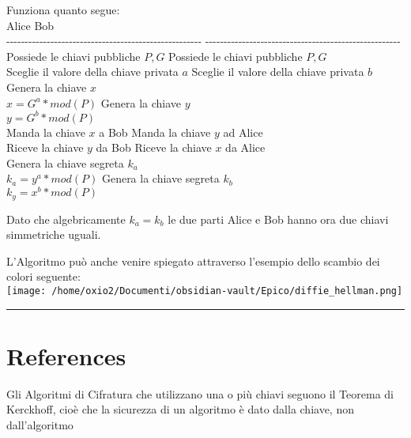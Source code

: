 \documentclass[
]{article}
\begin{document}
Funziona quanto segue:\\
\textbar{} Alice \textbar{} Bob \textbar{}\\
\textbar{}
-\/-\/-\/-\/-\/-\/-\/-\/-\/-\/-\/-\/-\/-\/-\/-\/-\/-\/-\/-\/-\/-\/-\/-\/-\/-\/-\/-\/-\/-\/-\/-\/-\/-\/-\/-\/-\/-\/-\/-\/-\/-\/-\/-\/-\/-\/-\/-\/-\/-\/-\/-\/-
\textbar{}
-\/-\/-\/-\/-\/-\/-\/-\/-\/-\/-\/-\/-\/-\/-\/-\/-\/-\/-\/-\/-\/-\/-\/-\/-\/-\/-\/-\/-\/-\/-\/-\/-\/-\/-\/-\/-\/-\/-\/-\/-\/-\/-\/-\/-\/-\/-\/-\/-\/-\/-\/-\/-
\textbar{}\\
\textbar{} Possiede le chiavi pubbliche {\(P,G\)} \textbar{} Possiede le
chiavi pubbliche {\(P,G\)} \textbar{}\\
\textbar{} Sceglie il valore della chiave privata {\(a\)} \textbar{}
Sceglie il valore della chiave privata {\(b\)} \textbar{}\\
\textbar{} Genera la chiave {\(x\)}\\
{\(x = G^{a} \ast mod(P)\)} \textbar{} Genera la chiave {\(y\)}\\
{\(y = G^{b} \ast mod(P)\)} \textbar{}\\
\textbar{} Manda la chiave {\(x\)} a Bob \textbar{} Manda la chiave
{\(y\)} ad Alice \textbar{}\\
\textbar{} Riceve la chiave {\(y\)} da Bob \textbar{} Riceve la chiave
{\(x\)} da Alice \textbar{}\\
\textbar{} Genera la chiave segreta {\(k_{a}\)}\\
{\(k_{a} = y^{a} \ast mod(P)\)} \textbar{} Genera la chiave segreta
{\(k_{b}\)}\\
{\(k_{y} = x^{b} \ast mod(P)\)} \textbar{}

Dato che algebricamente {\(k_{a} = k_{b}\)} le due parti Alice e Bob
hanno ora due chiavi simmetriche uguali.

L'Algoritmo può anche venire spiegato attraverso l'esempio dello scambio
dei colori seguente:\\
\texttt{[image: /home/oxio2/Documenti/obsidian-vault/Epico/diffie\_hellman.png]}

\begin{center}\rule{0.5\linewidth}{0.5pt}\end{center}

\hypertarget{references-8}{%
\section{References}\label{references-8}}

Gli Algoritmi di Cifratura che utilizzano una o più chiavi seguono il
Teorema di Kerckhoff, cioè che la sicurezza di un algoritmo è dato dalla
chiave, non dall'algoritmo
\end{document}
